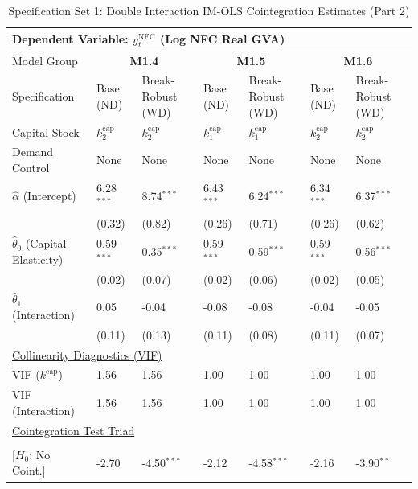 \begin{table}[H]
\centering
\caption{Specification Set 1: Double Interaction IM-OLS Cointegration Estimates (Part 2)}
\label{tab:spec_set_1_p2}
\scriptsize
\begin{tabular}{p{3.8cm}p{2.1cm}p{2.1cm}p{2.1cm}p{2.1cm}p{2.1cm}p{2.1cm}}
\toprule
\multicolumn{7}{l}{\textbf{Dependent Variable: $y_t^{\text{NFC}}$ (Log NFC Real GVA)}} \\
\midrule
Model Group & \multicolumn{2}{c}{\textbf{M1.4}} & \multicolumn{2}{c}{\textbf{M1.5}} & \multicolumn{2}{c}{\textbf{M1.6}}  \\
Specification & Base (ND) & Break-Robust (WD) & Base (ND) & Break-Robust (WD) & Base (ND) & Break-Robust (WD)  \\
Capital Stock & $k^{\text{cap}}_2$ & $k^{\text{cap}}_2$ & $k^{\text{cap}}_1$ & $k^{\text{cap}}_1$ & $k^{\text{cap}}_2$ & $k^{\text{cap}}_2$  \\
Demand Control & None & None & None & None & None & None  \\
\midrule
$\hat{\alpha}$ (Intercept)  & 6.28$^{***}$ & 8.74$^{***}$ & 6.43$^{***}$ & 6.24$^{***}$ & 6.34$^{***}$ & 6.37$^{***}$  \\
 & {\scriptsize (0.32)} & {\scriptsize (0.82)} & {\scriptsize (0.26)} & {\scriptsize (0.71)} & {\scriptsize (0.26)} & {\scriptsize (0.62)}  \\
[1ex]
$\hat{\theta}_0$ (Capital Elasticity)  & 0.59$^{***}$ & 0.35$^{***}$ & 0.59$^{***}$ & 0.59$^{***}$ & 0.59$^{***}$ & 0.56$^{***}$  \\
 & {\scriptsize (0.02)} & {\scriptsize (0.07)} & {\scriptsize (0.02)} & {\scriptsize (0.06)} & {\scriptsize (0.02)} & {\scriptsize (0.05)}  \\
$\hat{\theta}_1$ (Interaction)  & 0.05 & -0.04 & -0.08 & -0.08 & -0.04 & -0.05  \\
 & {\scriptsize (0.11)} & {\scriptsize (0.13)} & {\scriptsize (0.11)} & {\scriptsize (0.08)} & {\scriptsize (0.11)} & {\scriptsize (0.07)}  \\
\midrule
\multicolumn{7}{l}{\underline{Collinearity Diagnostics (VIF)}} \\
VIF ($k^{\text{cap}}$) & 1.56 & 1.56 & 1.00 & 1.00 & 1.00 & 1.00  \\
VIF (Interaction) & 1.56 & 1.56 & 1.00 & 1.00 & 1.00 & 1.00  \\
\midrule
\multicolumn{7}{l}{\underline{Cointegration Test Triad}} \\
\makecell[l]{Resid. ADF ($t_{\text{ADF}}$) \\ {\scriptsize [$H_0$: No Coint.]}} & -2.70 & -4.50$^{***}$ & -2.12 & -4.58$^{***}$ & -2.16 & -3.90$^{**}$  \\

\end{tabular}
\end{table}
